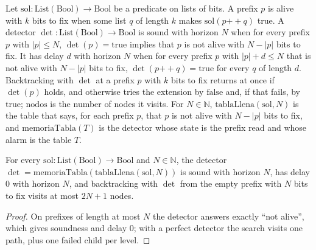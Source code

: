 \begin{definition}
  \label{def:information-table-detector}
  \leanok
  Let $\mathrm{sol} : \mathrm{List}(\mathrm{Bool}) \to \mathrm{Bool}$ be a predicate on lists of
  bits. A prefix $p$ is alive with $k$ bits to fix when some list $q$ of length $k$ makes
  $\mathrm{sol}(p \mathbin{+\!\!+} q)$ true. A detector $\det : \mathrm{List}(\mathrm{Bool}) \to
  \mathrm{Bool}$ is sound with horizon $N$ when for every prefix $p$ with $|p| \le N$, $\det(p) =
  \mathrm{true}$ implies that $p$ is not alive with $N - |p|$ bits to fix. It has delay $d$ with
  horizon $N$ when for every prefix $p$ with $|p| + d \le N$ that is not alive with $N - |p|$ bits
  to fix, $\det(p \mathbin{+\!\!+} q) = \mathrm{true}$ for every $q$ of length $d$. Backtracking
  with $\det$ at a prefix $p$ with $k$ bits to fix returns at once if $\det(p)$ holds, and
  otherwise tries the extension by $\mathrm{false}$ and, if that fails, by $\mathrm{true}$;
  $\mathrm{nodos}$ is the number of nodes it visits. For $N \in \mathbb{N}$,
  $\mathrm{tablaLlena}(\mathrm{sol}, N)$ is the table that says, for each prefix $p$, that $p$ is
  not alive with $N - |p|$ bits to fix, and $\mathrm{memoriaTabla}(T)$ is the detector whose state
  is the prefix read and whose alarm is the table $T$.
  \own{}
\end{definition}

\begin{theorem}
  \label{thm:information-perfect-table}
  \leanok
  For every $\mathrm{sol} : \mathrm{List}(\mathrm{Bool}) \to \mathrm{Bool}$ and $N \in \mathbb{N}$,
  the detector $\det = \mathrm{memoriaTabla}(\mathrm{tablaLlena}(\mathrm{sol}, N))$ is sound with
  horizon $N$, has delay $0$ with horizon $N$, and backtracking with $\det$ from the empty prefix
  with $N$ bits to fix visits at most $2N + 1$ nodes.
  \own{}
\end{theorem}

\begin{proof}
  \leanok
  On prefixes of length at most $N$ the detector answers exactly ``not alive'', which gives
  soundness and delay $0$; with a perfect detector the search visits one path, plus one failed
  child per level.
\end{proof}

